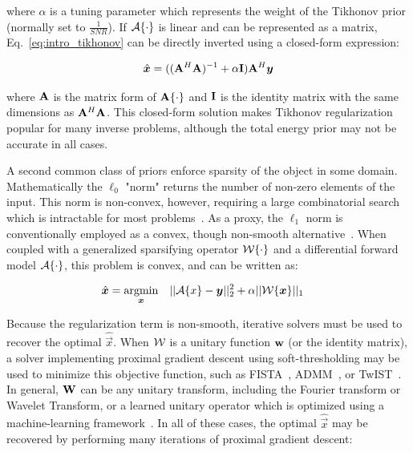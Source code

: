 \noindent where $\alpha$ is a tuning parameter which represents the weight of the Tikhonov prior (normally set to $\frac{1}{SNR}$). If $\mathcal{A}\{\cdot\}$ is linear and can be represented as a matrix, Eq.~\ref{eq:intro_tikhonov} can be directly inverted using a closed-form expression:

\begin{equation}
    \hat{\bm{x}} = ((\mathbf{A}^H \mathbf{A})^{-1} + \alpha \mathbf{I})\mathbf{A}^H \bm{y}
\end{equation}

\noindent where $\mathbf{A}$ is the matrix form of $\mathbf{A}\{\cdot\}$ and $\mathbf{I}$ is the identity matrix with the same dimensions as $\mathbf{A}^H \mathbf{A}$. This closed-form solution makes Tikhonov regularization popular for many inverse problems, although the total energy prior may not be accurate in all cases.

A second common class of priors enforce sparsity of the object in some domain. Mathematically the $\ell_0$ "norm" returns the number of non-zero elements of the input. This norm is non-convex, however, requiring a large combinatorial search which is intractable for most problems~\cite{candes2008enhancing}. As a proxy, the $\ell_1$ norm is conventionally employed as a convex, though non-smooth alternative~\cite{taylor1979deconvolution}. When coupled with a generalized sparsifying operator $\mathcal{W}\{\cdot\}$ and a differential forward model $\mathcal{A}\{\cdot\}$, this problem is convex, and can be written as:

\begin{equation}\label{eq:intro_sparse}
\begin{aligned}
& \hat{\bm{x}} = \underset{\bm{x}}{\text{argmin}}
& & ||\mathcal{A}\{x\}-\bm{y} ||_2^2 + \alpha||\mathcal{W}\{\bm{x}\}||_1
\end{aligned}
\end{equation}

Because the regularization term is non-smooth, iterative solvers must be used to recover the optimal $\hat{\vec{x}}$. When $\mathcal{W}$ is a unitary function $\mathbf{w}$ (or the identity matrix), a solver implementing proximal gradient descent using soft-thresholding may be used to minimize this objective function, such as FISTA~\cite{beck2009fast}, ADMM~\cite{boyd2011distributed}, or TwIST~\cite{bioucas2007new}. In general, $\mathbf{W}$ can be any unitary transform, including the Fourier transform  or Wavelet Transform, or a learned unitary operator which is optimized using a machine-learning framework~\cite{ravishankar2013learning}. In all of these cases, the optimal $\hat{\vec{x}}$ may be recovered by performing many iterations of proximal gradient descent:

